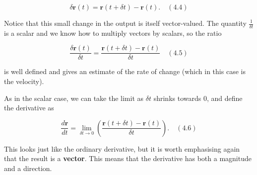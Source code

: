 \documentclass[11pt,titlepage]{article}
\numberwithin{equation}{section}
\begin{document}
\begin{equation}
\delta \mathbf{r}(t) = \mathbf{r}(t + \delta t) - \mathbf{r}(t). \quad (4.4)
\end{equation}

Notice that this small change in the output is itself vector-valued. The quantity $\frac{1}{\delta t}$ is a scalar and we know how to multiply vectors by scalars, so the ratio

\begin{equation}
\frac{\delta \mathbf{r}(t)}{\delta t} = \frac{\mathbf{r}(t + \delta t) - \mathbf{r}(t)}{\delta t} \quad (4.5)
\end{equation}

is well defined and gives an estimate of the rate of change (which in this case is the velocity).

As in the scalar case, we can take the limit as $\delta t$ shrinks towards 0, and define the derivative as

\begin{equation}
\frac{d\mathbf{r}}{dt} = \lim_{\delta t \to 0} \left( \frac{\mathbf{r}(t + \delta t) - \mathbf{r}(t)}{\delta t} \right). \quad (4.6)
\end{equation}

This looks just like the ordinary derivative, but it is worth emphasising again that the result is a \textbf{vector}. This means that the derivative has both a magnitude and a direction.
\end{document}
